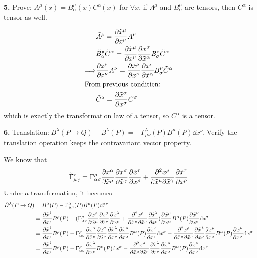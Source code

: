 \documentclass{article}
\begin{document}
{\bf5.}\quad
Prove: $A^{\mu}(x)=B^{\mu}_{\alpha}(x)C^{\alpha}(x)$ for $\forall x$, if $A^{\mu}$ and $B^{\mu}_{\alpha}$ are tensors, then $C^{\alpha}$ is tensor as well.

\begin{align*}
  &\tilde A^{\mu}=\pdv{\tilde x^{\mu}}{x^{\nu}}A^{\nu}\\
  &\tilde B^{\mu}_{\alpha}\tilde C^{\alpha}=\pdv{\tilde x^{\mu}}{x^{\nu}}\pdv{x^{\sigma}}{\tilde x^{\alpha}}B^{\nu}_{\sigma}\tilde C^{\alpha}\\
  \Longrightarrow&\pdv{\tilde x^{\mu}}{x^{\nu}}A^{\nu}=\pdv{\tilde x^{\mu}}{x^{\nu}}\pdv{x^{\sigma}}{\tilde x^{\alpha}}B^{\nu}_{\sigma}\tilde C^{\alpha}\\
  \intertext{From previous condition: }&\tilde C^{\alpha}=\pdv{\tilde x^{\alpha}}{x^{\sigma}}C^{\sigma}
\end{align*}
which is exactly the transformation law of a tensor, so $C^{\alpha}$ is a tensor.

{\bf6.}\quad
Translation: $B^{\lambda}(P\rightarrow Q)-B^{\lambda}(P)=-\Gamma^{\lambda}_{\mu\nu}(P)B^{\mu}(P)\dd x^{\nu}$. Verify the translation operation keeps the contravariant vector property.

We know that
$$\tilde\Gamma^{\tau}_{\mu\gamma}=\Gamma^{\rho}_{\alpha\sigma}\pdv{x^{\alpha}}{\tilde x^{\mu}}\pdv{x^{\sigma}}{\tilde x^{\gamma}}\pdv{\tilde x^{\tau}}{x^{\rho}}+\pdv{x^{\rho}}{\tilde x^{\mu}}{\tilde x^{\gamma}}\pdv{\tilde x^{\tau}}{x^{\rho}}$$
Under a transformation, it becomes
\begin{align*}
  \tilde B^{\lambda}(P\rightarrow Q)&=\tilde B^{\lambda}(P)-\tilde\Gamma^{\lambda}_{\mu\nu}(P)\tilde B^{\mu}(P)\dd \tilde x^{\nu}\\
  &=\pdv{\tilde x^{\lambda}}{x^{\rho}}B^{\rho}(P)-(\Gamma^{\rho}_{\alpha\sigma}\pdv{x^{\alpha}}{\tilde x^{\mu}}\pdv{x^{\sigma}}{\tilde x^{\nu}}\pdv{\tilde x^{\lambda}}{x^{\rho}}+\pdv{x^{\rho}}{\tilde x^{\mu}}{\tilde x^{\nu}}\pdv{\tilde x^{\lambda}}{x^{\rho}})\pdv{\tilde x^{\mu}}{x^{\alpha}}B^{\alpha}(P)\pdv{\tilde x^{\nu}}{x^{\sigma}}\dd x^{\sigma}\\
  &=\pdv{\tilde x^{\lambda}}{x^{\rho}}B^{\rho}(P)-\Gamma^{\rho}_{\alpha\sigma}\pdv{x^{\alpha}}{\tilde x^{\mu}}\pdv{x^{\sigma}}{\tilde x^{\nu}}\pdv{\tilde x^{\lambda}}{x^{\rho}}\pdv{\tilde x^{\mu}}{x^{\alpha}}B^{\alpha}(P)\pdv{\tilde x^{\nu}}{x^{\sigma}}\dd x^{\sigma}-\pdv{x^{\rho}}{\tilde x^{\mu}}{\tilde x^{\nu}}\pdv{\tilde x^{\lambda}}{x^{\rho}}\pdv{\tilde x^{\mu}}{x^{\alpha}}B^{\alpha}(P)\pdv{\tilde x^{\nu}}{x^{\sigma}}\dd x^{\sigma}\\
  &=\pdv{\tilde x^{\lambda}}{x^{\rho}}B^{\rho}(P)-\Gamma^{\rho}_{\alpha\sigma}\pdv{\tilde x^{\lambda}}{x^{\rho}}B^{\alpha}(P)\dd x^{\sigma}-\pdv{x^{\rho}}{\tilde x^{\mu}}{\tilde x^{\nu}}\pdv{\tilde x^{\lambda}}{x^{\rho}}\pdv{\tilde x^{\mu}}{x^{\alpha}}B^{\alpha}(P)\pdv{\tilde x^{\nu}}{x^{\sigma}}\dd x^{\sigma}
\end{align*}
\end{document}
